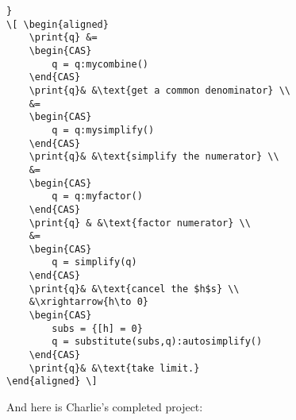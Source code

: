 \documentclass{article}
\begin{document}
\begin{codebox}
\begin{verbatim}
}
\[ \begin{aligned} 
    \print{q} &=
    \begin{CAS}
        q = q:mycombine()
    \end{CAS}
    \print{q}& &\text{get a common denominator} \\ 
    &= 
    \begin{CAS}
        q = q:mysimplify()
    \end{CAS}
    \print{q}& &\text{simplify the numerator} \\ 
    &= 
    \begin{CAS}
        q = q:myfactor()
    \end{CAS}
    \print{q} & &\text{factor numerator} \\ 
    &=
    \begin{CAS}
        q = simplify(q)
    \end{CAS}
    \print{q}& &\text{cancel the $h$s} \\ 
    &\xrightarrow{h\to 0}
    \begin{CAS}
        subs = {[h] = 0}
        q = substitute(subs,q):autosimplify()
    \end{CAS}
    \print{q}& &\text{take limit.}
\end{aligned} \] 
\end{verbatim}
\end{codebox}
And here is Charlie's completed project:
\end{document}
